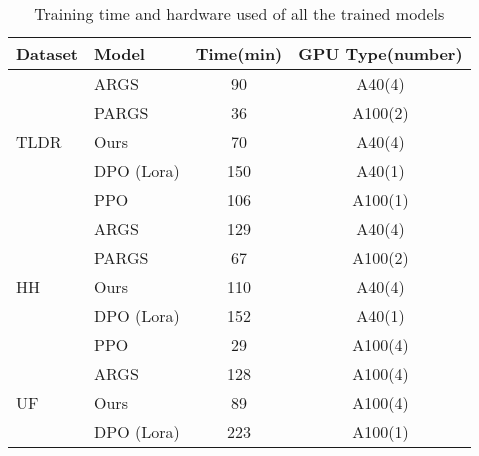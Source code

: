 \begin{table}[htbp]
    \centering
    \footnotesize
    \begin{tabular}{l l c c}
        \toprule
        \textbf{Dataset} & \textbf{Model} & \textbf{Time(min)} & \textbf{GPU Type(number)}\\
        \midrule
        \multirow{5}{*}{TLDR} & ARGS & 90 & A40(4)\\
        & PARGS & 36 & A100(2)\\
        & Ours & 70 & A40(4)  \\
        & DPO (Lora) & 150  & A40(1) \\
        & PPO & 106 & A100(1)  \\
        \midrule
        \multirow{5}{*}{HH} & ARGS & 129 & A40(4)\\
        & PARGS & 67 & A100(2)\\
        & Ours & 110 & A40(4)  \\
        & DPO (Lora) & 152  & A40(1) \\
        & PPO & 29 & A100(4)  \\
        \midrule
        \multirow{3}{*}{UF}  & ARGS & 128 & A100(4) \\
        & Ours & 89  & A100(4) \\
        & DPO (Lora) & 223 & A100(1)  \\
        \bottomrule
    \end{tabular}
      \caption{Training time and hardware used of all the trained models}
    \label{tab:training_time}
\end{table}





